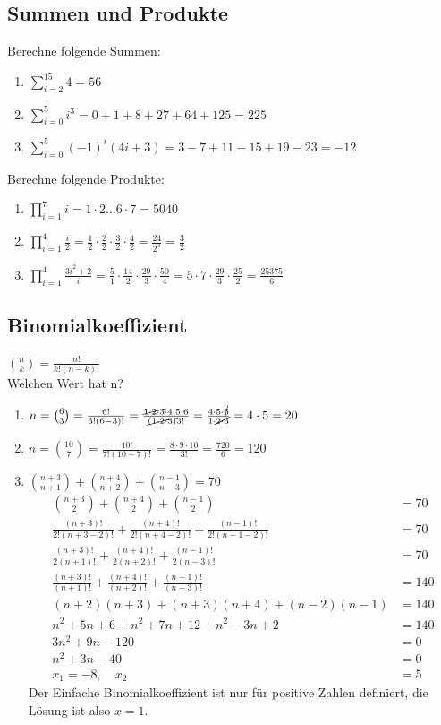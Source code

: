 \documentclass[11pt, a4paper]{article}
\begin{document}
\subsection{Summen und Produkte}
Berechne folgende Summen:
\begin{enumerate}
	\item $\sum_{i=2}^{15} 4 = 56$
	\item $\sum_{i=0}^5 i^3 = 0 + 1 + 8 + 27 + 64 + 125 = 225$
	\item $\sum_{i=0}^5 (-1)^i (4i+3) = 3-7+11-15+19-23 = -12$
\end{enumerate}
Berechne folgende Produkte:
\begin{enumerate}
	\item $\prod_{i=1}^7 i = 1 \cdot 2 \dots 6 \cdot 7 = 5040$
	\item $\prod_{i=1}^4 \frac{i}{2} = \frac{1}{2} \cdot \frac{2}{2} \cdot \frac{3}{2} \cdot \frac{4}{2} = \frac{24}{2^4} = \frac{3}{2}$
	\item $\prod_{i=1}^4 \frac{3i^2+2}{i} = \frac{5}{1} \cdot \frac{14}{2} \cdot \frac{29}{3} \cdot \frac{50}{4} = 5 \cdot 7 \cdot \frac{29}{3} \cdot \frac{25}{2} = \frac{25375}{6}$
\end{enumerate}

\subsection{Binomialkoeffizient}
$\binom{n}{k} = \frac{n!}{k!(n-k)!}$ \\
Welchen Wert hat n?
\begin{enumerate}
	\item $ n = \binom{6}{3} = \frac{6!}{3!(6-3)!} = \frac{\cancel{1\cdot2\cdot3}\cdot4\cdot5\cdot6}{\cancel{(1\cdot2\cdot3)}3!} = \frac{4\cdot5\cdot\cancel{6}}{1\cdot\cancel{2\cdot3}} = 4\cdot5 = 20$
	\item $n = \binom{10}{7} = \frac{10!}{7!(10-7)!} = \frac{8 \cdot 9 \cdot 10}{3!} = \frac{720}{6} = 120$
	\item $\binom{n+3}{n+1} + \binom{n+4}{n+2} + \binom{n-1}{n-3} = 70$
		\begin{align*}
			\binom{n+3}{2} + \binom{n+4}{2} + \binom{n-1}{2} &= 70 \\
			\frac{(n+3)!}{2!(n+3-2)!} + \frac{(n+4)!}{2!(n+4-2)!} + \frac{(n-1)!}{2!(n-1-2)!} &= 70 \tag{Definition} \\
			\frac{(n+3)!}{2(n+1)!} + \frac{(n+4)!}{2(n+2)!} + \frac{(n-1)!}{2(n-3)!} &= 70 \\
			\frac{(n+3)!}{(n+1)!} + \frac{(n+4)!}{(n+2)!} + \frac{(n-1)!}{(n-3)!} &= 140 \tag{Kürzen} \\
			(n+2)(n+3) + (n+3)(n+4) + (n-2)(n-1) &= 140 \\
			n^2+5n+6 + n^2+7n+12 + n^2-3n+2 &= 140 \\
			3n^2+9n-120 &= 0 \\
			n^2+3n-40 &= 0 \tag{PQ-Formel} \\
			x_1 = -8, \quad x_2 &= 5 \tag{Probe!}
		\end{align*}
		Der Einfache Binomialkoeffizient ist nur für positive Zahlen definiert, die Lösung ist also $x=1$.
\end{enumerate}
\end{document}
